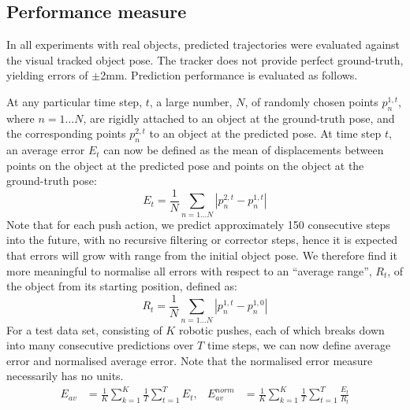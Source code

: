 \subsection{Performance measure}\label{sec:Experiment.Performance}

In all experiments with real objects, predicted trajectories were evaluated against the visual tracked object pose. The tracker does not provide perfect ground-truth, yielding errors of $\pm$2mm. Prediction performance is evaluated as follows.

At any particular time step, $t$, a large number, $N$, of randomly chosen points $p_{n}^{1,t}$, where $n=1 \ldots N$, are rigidly attached to an object at the ground-truth pose, and the corresponding points $p_{n}^{2,t}$ to an object at the predicted pose. At time step $t$, an average error $E_t$ can now be defined as the mean of displacements between points on the object at the predicted pose and points on the object at the ground-truth pose:
\begin{equation}
E_t = \frac{1}{N} \mathop{\sum}_{n=1 \ldots N}|p_{n}^{2,t}-p_{n}^{1,t}|
\label{eq:defn_Rt}
\end{equation}
Note that for each push action, we predict approximately 150
consecutive steps into the future, with no recursive filtering or
corrector steps, hence it is expected that errors will grow with range
from the initial object pose. We therefore find it more meaningful to
normalise all errors with respect to an ``average range'', $R_t$, of
the object from its starting position, defined as:
\begin{equation}
R_t = \frac{1}{N} \mathop{\sum}_{n=1 \ldots N}|p_{n}^{1,t}-p_{n}^{1,0}|
\label{eq:defn_Et}
\end{equation}
For a test data set, consisting of $K$ robotic pushes, each of which breaks down into many consecutive predictions over $T$ time steps, we can now define average error and normalised average error. Note that the normalised error measure necessarily has no units.
\begin{align}
E_{av} &= \frac{1}{K} \mathop{\sum}_{k=1}^{K} \frac{1}{T} \mathop{\sum}_{t=1}^{T} E_t,
&E_{av}^{norm} &= \frac{1}{K} \mathop{\sum}_{k=1}^{K} \frac{1}{T} \mathop{\sum}_{t=1}^{T} \frac{E_t}{R_t}
\label{eq:Error1}
\end{align}


